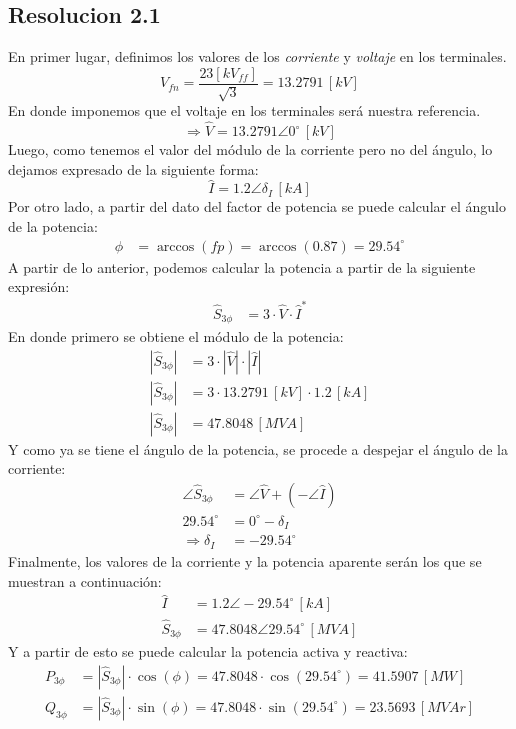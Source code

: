 \documentclass[
  11pt,
  letterpaper,
   addpoints,
   answers
  ]{exam}
\begin{document}
\begin{questions}
\begin{solution}
\subsection*{Resolucion 2.1}
En primer lugar, definimos los valores de los \textit{corriente} y \textit{voltaje} en los terminales.
\[
V_{fn} = \frac{23[kV_{ff}]}{\sqrt{3}} = 13.2791 \, [kV]
\]
En donde imponemos que el voltaje en los terminales será nuestra referencia.
\[
\Rightarrow \hat{V} = 13.2791 \angle 0^\circ \, [kV]
\]
Luego, como tenemos el valor del módulo de la corriente pero no del ángulo, lo dejamos expresado de la siguiente forma:
\[
\hat{I} = 1.2 \angle \delta_{I} \, [kA]
\]
Por otro lado, a partir del dato del factor de potencia se puede calcular el ángulo de la potencia:
\begin{align}
\phi &= \arccos(fp) = \arccos(0.87) = 29.54^\circ
\end{align}
A partir de lo anterior, podemos calcular la potencia a partir de la siguiente expresión:
\begin{align}
\hat{S}_{3\phi} &= 3 \cdot \hat{V} \cdot \hat{I}^*
\end{align}
En donde primero se obtiene el módulo de la potencia:
\begin{align}
|\hat{S}_{3\phi}| &= 3 \cdot |\hat{V}| \cdot |\hat{I}| \\
|\hat{S}_{3\phi}| &= 3 \cdot 13.2791 \, [kV] \cdot 1.2 \, [kA] \\
|\hat{S}_{3\phi}| &= 47.8048 \, [MVA]
\end{align}
Y como ya se tiene el ángulo de la potencia, se procede a despejar el ángulo de la corriente:
\begin{align}
\angle \hat{S}_{3\phi} &= \angle \hat{V} + (- \angle \hat{I}) \\
29.54^\circ &= 0^\circ - \delta_{I} \\
\Rightarrow \delta_{I} &= -29.54^\circ
\end{align}
Finalmente, los valores de la corriente y la potencia aparente serán los que se muestran a continuación:
\begin{align}
\hat{I} &= 1.2 \angle -29.54^\circ \, [kA] \\
\hat{S}_{3\phi} &= 47.8048 \angle 29.54^\circ \, [MVA]
\end{align}
Y a partir de esto se puede calcular la potencia activa y reactiva:
\begin{align}
P_{3\phi} &= |\hat{S}_{3\phi}| \cdot \cos(\phi) = 47.8048 \cdot \cos(29.54^\circ) = 41.5907 \, [MW] \\
Q_{3\phi} &= |\hat{S}_{3\phi}| \cdot \sin(\phi) = 47.8048 \cdot \sin(29.54^\circ) = 23.5693 \, [MVAr]
\end{align}

\end{solution}
\end{questions}
\end{document}
